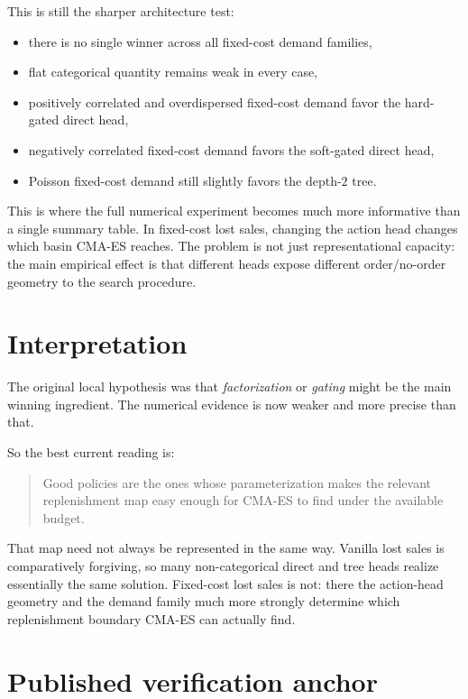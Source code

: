\documentclass[11pt]{article}
\begin{document}
This is still the sharper architecture test:
\begin{itemize}
    \item there is no single winner across all fixed-cost demand families,
    \item flat categorical quantity remains weak in every case,
    \item positively correlated and overdispersed fixed-cost demand favor the hard-gated direct
    head,
    \item negatively correlated fixed-cost demand favors the soft-gated direct head,
    \item Poisson fixed-cost demand still slightly favors the depth-$2$ tree.
\end{itemize}

This is where the full numerical experiment becomes much more informative than a single summary
table. In fixed-cost lost sales, changing the action head changes which basin CMA-ES reaches. The
problem is not just representational capacity: the main empirical effect is that different heads
expose different order/no-order geometry to the search procedure.

\section{Interpretation}

The original local hypothesis was that \emph{factorization} or \emph{gating} might be the main
winning ingredient. The numerical evidence is now weaker and more precise than that.

So the best current reading is:
\begin{quote}
Good policies are the ones whose parameterization makes the relevant replenishment map easy enough
for CMA-ES to find under the available budget.
\end{quote}

That map need not always be represented in the same way. Vanilla lost sales is comparatively
forgiving, so many non-categorical direct and tree heads realize essentially the same solution.
Fixed-cost lost sales is not: there the action-head geometry and the demand family much more
strongly determine which replenishment boundary CMA-ES can actually find.

\section{Published verification anchor}
\end{document}
